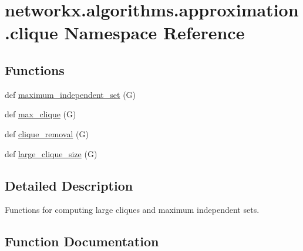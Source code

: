 \hypertarget{namespacenetworkx_1_1algorithms_1_1approximation_1_1clique}{}\section{networkx.\+algorithms.\+approximation.\+clique Namespace Reference}
\label{namespacenetworkx_1_1algorithms_1_1approximation_1_1clique}
\subsection*{Functions}
\begin{DoxyCompactItemize}
\item 
def \hyperlink{namespacenetworkx_1_1algorithms_1_1approximation_1_1clique_a2cee5576172ab5ed821728432f9cb6cd}{maximum\+\_\+independent\+\_\+set} (G)
\item 
def \hyperlink{namespacenetworkx_1_1algorithms_1_1approximation_1_1clique_aa80ba180313409cdcfaeea9e076d6e26}{max\+\_\+clique} (G)
\item 
def \hyperlink{namespacenetworkx_1_1algorithms_1_1approximation_1_1clique_a6cfd284655e1f3fe987f25c70123d9dc}{clique\+\_\+removal} (G)
\item 
def \hyperlink{namespacenetworkx_1_1algorithms_1_1approximation_1_1clique_a847f951b783309c66549bd763641407d}{large\+\_\+clique\+\_\+size} (G)
\end{DoxyCompactItemize}


\subsection{Detailed Description}
\begin{DoxyVerb}Functions for computing large cliques and maximum independent sets.\end{DoxyVerb}
 

\subsection{Function Documentation}
\mbox{\label{namespacenetworkx_1_1algorithms_1_1approximation_1_1clique_a6cfd284655e1f3fe987f25c70123d9dc}} 
